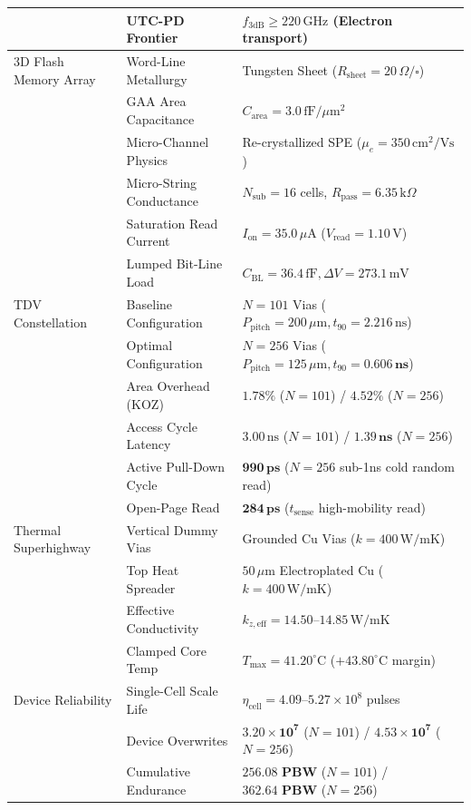 \documentclass[journal]{IEEEtran}
\begin{document}
\begin{table}[!t]
{\begin{tabular}{lll}
& UTC-PD Frontier & $f_{3\text{dB}} \ge 220\,\text{GHz}$ (Electron transport) \\
\midrule
3D Flash Memory Array & Word-Line Metallurgy & Tungsten Sheet ($R_{\text{sheet}} = 20\,\Omega/\square$) \\
& GAA Area Capacitance & $C_{\text{area}} = 3.0\,\text{fF}/\mu\text{m}^2$ \\
& Micro-Channel Physics & Re-crystallized SPE ($\mu_e = 350\,\text{cm}^2/\text{Vs}$) \\
& Micro-String Conductance & $N_{\text{sub}} = 16$ cells, $R_{\text{pass}} = 6.35\,\text{k}\Omega$ \\
& Saturation Read Current & $I_{\text{on}} = 35.0\,\mu\text{A}$ ($V_{\text{read}} = 1.10\,\text{V}$) \\
& Lumped Bit-Line Load & $C_{\text{BL}} = 36.4\,\text{fF}, \Delta V = 273.1\,\text{mV}$ \\
\midrule
TDV Constellation & Baseline Configuration & $N = 101$ Vias ($P_{\text{pitch}} = 200\,\mu\text{m}, t_{90} = 2.216\,\text{ns}$) \\
& Optimal Configuration & $N = 256$ Vias ($P_{\text{pitch}} = 125\,\mu\text{m}, t_{90} = \mathbf{0.606\,\text{ns}}$) \\
& Area Overhead (KOZ) & $1.78\%$ ($N=101$) / $4.52\%$ ($N=256$) \\
& Access Cycle Latency & $3.00\,\text{ns}$ ($N=101$) / $\mathbf{1.39\,\text{ns}}$ ($N=256$) \\
& Active Pull-Down Cycle & $\mathbf{990\,\text{ps}}$ ($N=256$ sub-1ns cold random read) \\
& Open-Page Read & $\mathbf{284\,\text{ps}}$ ($t_{\text{sense}}$ high-mobility read) \\
\midrule
Thermal Superhighway & Vertical Dummy Vias & Grounded Cu Vias ($k = 400\,\text{W/mK}$) \\
& Top Heat Spreader & $50\,\mu\text{m}$ Electroplated Cu ($k = 400\,\text{W/mK}$) \\
& Effective Conductivity & $k_{z,\text{eff}} = 14.50\text{--}14.85\,\text{W/mK}$ \\
& Clamped Core Temp & $T_{\max} = 41.20^\circ\text{C}$ ($+43.80^\circ\text{C}$ margin) \\
\midrule
Device Reliability & Single-Cell Scale Life & $\eta_{\text{cell}} = 4.09\text{--}5.27 \times 10^8$ pulses \\
& Device Overwrites & $\mathbf{3.20 \times 10^7}$ ($N=101$) / $\mathbf{4.53 \times 10^7}$ ($N=256$) \\
& Cumulative Endurance & $\mathbf{256.08\text{ PBW}}$ ($N=101$) / $\mathbf{362.64\text{ PBW}}$ ($N=256$) \\
\bottomrule
\end{tabular}
}
\end{table}
\end{document}
